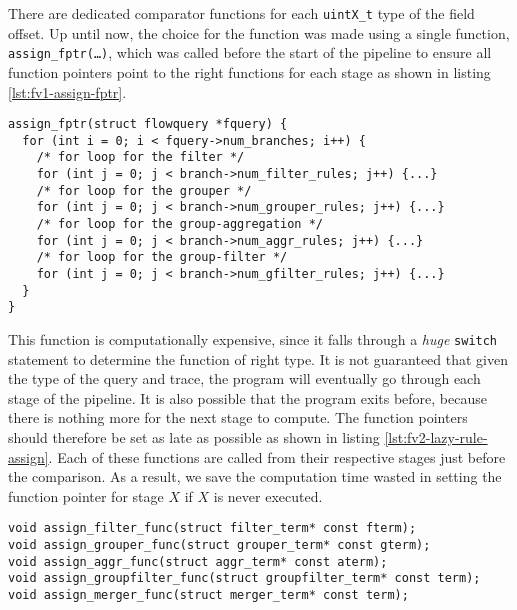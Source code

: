 There are dedicated comparator functions for each \texttt{uintX\_t} type of
the field offset. Up until now, the choice for the function was made using a
single function, \texttt{assign\_fptr(\ldots)}, which was called before the
start of the pipeline to ensure all function pointers point to the right
functions for each stage as shown in listing \ref{lst:fv1-assign-fptr}.


\begin{lstlisting}
assign_fptr(struct flowquery *fquery) {
  for (int i = 0; i < fquery->num_branches; i++) {
    /* for loop for the filter */
    for (int j = 0; j < branch->num_filter_rules; j++) {...}
    /* for loop for the grouper */
    for (int j = 0; j < branch->num_grouper_rules; j++) {...}
    /* for loop for the group-aggregation */
    for (int j = 0; j < branch->num_aggr_rules; j++) {...}
    /* for loop for the group-filter */
    for (int j = 0; j < branch->num_gfilter_rules; j++) {...}
  }
}
\end{lstlisting}

This function is computationally expensive, since it falls through a
\emph{huge} \texttt{switch} statement to determine the function of right type.
It is not guaranteed that given the type of the query and trace, the program
will eventually go through each stage of the pipeline. It is also possible
 that the program exits before, because
there is nothing more for the next stage to compute. The function pointers
should therefore be set as late as possible as shown in listing
\ref{lst:fv2-lazy-rule-assign}. Each of these functions are called from their
respective stages just before the comparison.  As a result, we save the
computation time wasted in setting the function pointer for stage $X$ if $X$
is never executed.

\begin{lstlisting}
void assign_filter_func(struct filter_term* const fterm);
void assign_grouper_func(struct grouper_term* const gterm);
void assign_aggr_func(struct aggr_term* const aterm);
void assign_groupfilter_func(struct groupfilter_term* const term);
void assign_merger_func(struct merger_term* const term);
\end{lstlisting}





